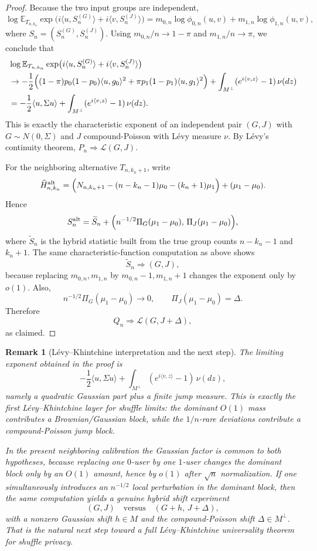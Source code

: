 \documentclass{article}
\newtheorem{remark}[theorem]{Remark}
\begin{document}
\begin{proof}
Because the two input groups are independent,
\[
\log \mathbb E_{T_{n,k_n}}\exp\bigl(i\langle u,S_n^{(G)}\rangle+i\langle v,S_n^{(J)}\rangle\bigr)
=m_{0,n}\log\phi_{0,n}(u,v)+m_{1,n}\log\phi_{1,n}(u,v),
\]
where $S_n=(S_n^{(G)},S_n^{(J)})$. Using $m_{0,n}/n\to 1-\pi$ and $m_{1,n}/n\to\pi$, we conclude that
\begin{align*}
&\log \mathbb E_{T_{n,k_n}}\exp\bigl(i\langle u,S_n^{(G)}\rangle+i\langle v,S_n^{(J)}\rangle\bigr) \\
&\to
-\frac12\Bigl((1-\pi)p_0(1-p_0)\langle u,g_0\rangle^2
+\pi p_1(1-p_1)\langle u,g_1\rangle^2\Bigr)
+\int_{M^\perp}(e^{i\langle v,z\rangle}-1)\,\nu(dz) \\
&=
-\frac12\langle u,\Sigma u\rangle
+\int_{M^\perp}(e^{i\langle v,z\rangle}-1)\,\nu(dz).
\end{align*}
This is exactly the characteristic exponent of an independent pair $(G,J)$ with
$G\sim N(0,\Sigma)$ and $J$ compound-Poisson with L\'evy measure $\nu$. By L\'evy's continuity theorem,
$P_n\Longrightarrow\mathcal L(G,J)$.

For the neighboring alternative $T_{n,k_n+1}$, write
\[
\widehat H_{n,k_n}^{\mathrm{alt}}
=\Bigl(N_{n,k_n+1}-(n-k_n-1)\mu_0-(k_n+1)\mu_1\Bigr)+(\mu_1-\mu_0).
\]
Hence
\[
S_n^{\mathrm{alt}}
=\widetilde S_n+
\Bigl(n^{-1/2}\Pi_G(\mu_1-\mu_0),\,\Pi_J(\mu_1-\mu_0)\Bigr),
\]
where $\widetilde S_n$ is the hybrid statistic built from the true group counts $n-k_n-1$ and $k_n+1$.
The same characteristic-function computation as above shows
\[
\widetilde S_n\Longrightarrow (G,J),
\]
because replacing $m_{0,n},m_{1,n}$ by $m_{0,n}-1,m_{1,n}+1$ changes the exponent only by $o(1)$. Also,
\[
n^{-1/2}\Pi_G(\mu_1-\mu_0)\to 0,
\qquad
\Pi_J(\mu_1-\mu_0)=\Delta.
\]
Therefore
\[
Q_n\Longrightarrow \mathcal L(G,J+\Delta),
\]
as claimed.
\end{proof}

\begin{remark}[L\'evy--Khintchine interpretation and the next step]
The limiting exponent obtained in the proof is
\[
-\frac12\langle u,\Sigma u\rangle
+\int_{M^\perp}(e^{i\langle v,z\rangle}-1)\,\nu(dz),
\]
namely a quadratic Gaussian part plus a finite jump measure. This is exactly the first L\'evy--Khintchine
layer for shuffle limits: the dominant $O(1)$ mass contributes a Brownian/Gaussian block, while the
$1/n$-rare deviations contribute a compound-Poisson jump block.

In the present neighboring calibration the Gaussian factor is common to both hypotheses, because replacing
one $0$-user by one $1$-user changes the dominant block only by an $O(1)$ amount, hence by $o(1)$ after
$\sqrt n$ normalization. If one simultaneously introduces an $n^{-1/2}$ local perturbation in the dominant
block, then the same computation yields a genuine hybrid shift experiment
\[
(G,J)
\quad\text{versus}\quad
(G+h,\,J+\Delta),
\]
with a nonzero Gaussian shift $h\in M$ and the compound-Poisson shift $\Delta\in M^\perp$. That is the
natural next step toward a full L\'evy--Khintchine universality theorem for shuffle privacy.
\end{remark}
\end{document}
